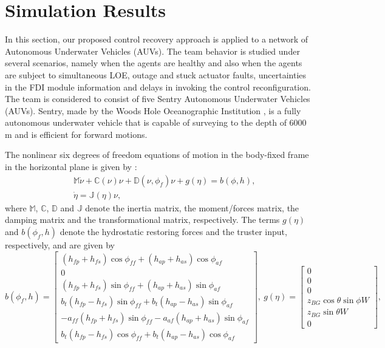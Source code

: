 \documentclass[12pt,draftcls,onecolumn]{IEEEtran}
\begin{document}
\section{Simulation Results}\label{simulation results}
In this section, our proposed control recovery approach is applied to a network  of  Autonomous Underwater Vehicles (AUVs). The team behavior is studied under several  scenarios, namely when the  agents are healthy and also when the agents are subject to simultaneous LOE,  outage and stuck actuator faults, uncertainties in the FDI module information and delays in invoking the control reconfiguration.  The team is considered to  consist  of  five Sentry Autonomous Underwater Vehicles (AUVs). Sentry, made by the Woods Hole Oceanographic Institution \cite{jakuba2003}, is a fully autonomous underwater vehicle that is capable of surveying to the depth of 6000 m and is efficient for forward motions.   \par
The nonlinear six degrees of freedom equations of motion in the body-fixed frame in the horizontal plane is given by \cite{fossen94}:
\begin{eqnarray*}
&&\mathbb{M}\dot\nu +\mathbb{C}(\nu)\nu +\mathbb{D}(\nu,\phi_f)\nu +g(\eta)=b(\phi,h),\\
&&\dot\eta=\mathbb{J}(\eta)\nu,
\end{eqnarray*}
where $\mathbb{M}$, $\mathbb{C}$, $\mathbb{D}$ and $\mathbb{J}$ denote the inertia matrix, the moment/forces matrix, the damping matrix and the transformational matrix, respectively. The terms $g(\eta)$ and $b(\phi_f,h)$ denote the hydrostatic restoring forces and the truster input, respectively, and are given by 
$$b(\phi_f,h)=\begin{bmatrix}(h_{fp}+h_{fs})\cos \phi_{ff}+(h_{ap}+h_{as})\cos \phi_{af}\\0\\(h_{fp}+h_{fs})\sin \phi_{ff}+(h_{ap}+h_{as})\sin \phi_{af}\\ b_t(h_{fp}-h_{fs})\sin \phi_{ff}+b_t(h_{ap}-h_{as})\sin \phi_{af}\\-a_{ff}(h_{fp}+h_{fs})\sin \phi_{ff}-a_{af}(h_{ap}+h_{as})\sin \phi_{af}\\b_t(h_{fp}-h_{fs})\cos \phi_{ff}+b_t(h_{ap}-h_{as})\cos \phi_{af}\
\end{bmatrix},\ g(\eta)=\begin{bmatrix} 0\\0\\0\\z_{BG}\cos\theta \sin\phi W\\z_{BG}\sin \theta W\\0\end{bmatrix},$$
\end{document}
